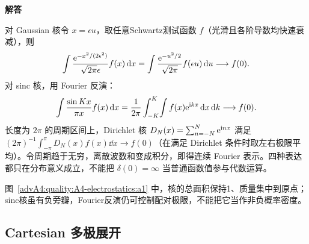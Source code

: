 \begin{advsolution}
\begin{center}\begin{minipage}{.96\linewidth}\centering
\raggedright{\bfseries\color{DeepBlue}解答}\par\smallskip\centering

\label{advA4:quality:A4-electrostatics:a1}
\end{minipage}\end{center}

对 Gaussian 核令 $x=\epsilon u$，取任意Schwartz测试函数 $f$（光滑且各阶导数均快速衰减），则
\[
 \int\frac{\mathrm e^{-x^2/(2\epsilon^2)}}{\sqrt{2\pi}\epsilon}f(x)\mathop{}\!\mathrm d x
 =\int\frac{\mathrm e^{-u^2/2}}{\sqrt{2\pi}}f(\epsilon u)\mathop{}\!\mathrm d u
 \longrightarrow f(0).
\]
对 sinc 核，用 Fourier 反演：
\[
 \int\frac{\sin Kx}{\pi x}f(x)\mathop{}\!\mathrm d x
 =\frac1{2\pi}\int_{-K}^{K}\!\int f(x)\mathrm e^{\mathrm i kx}\mathop{}\!\mathrm d x\mathop{}\!\mathrm d k
 \longrightarrow f(0).
\]
长度为 $2\pi$ 的周期区间上，Dirichlet 核
$D_N(x)=\sum_{n=-N}^{N}\mathrm e^{\mathrm i nx}$ 满足
$(2\pi)^{-1}\int_{-\pi}^{\pi}D_N(x)f(x)\dd x\to f(0)$（在满足 Dirichlet 条件时取左右极限平均）。令周期趋于无穷，离散波数和变成积分，即得连续 Fourier 表示。四种表达都只在分布意义成立，不能把 $\delta(0)=\infty$ 当普通函数值参与代数运算。

图~\ref{advA4:quality:A4-electrostatics:a1} 中，核的总面积保持1、质量集中到原点；sinc核虽有负旁瓣，Fourier反演仍可控制配对极限，不能把它当作非负概率密度。
\end{advsolution}

\subsection{Cartesian 多极展开}

